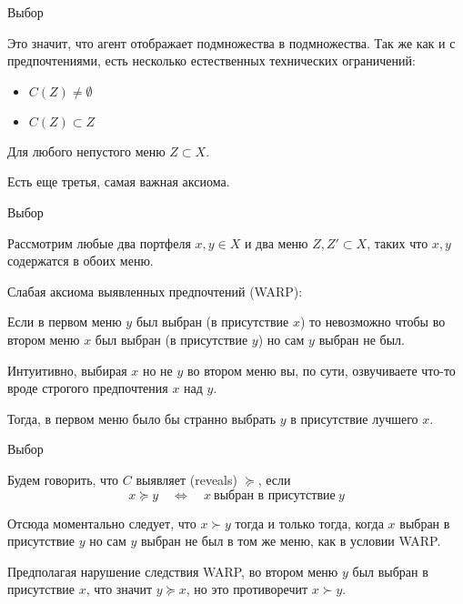 \documentclass{beamer}
\begin{document}
\begin{frame}{Выбор}

Это значит, что агент отображает подмножества в подмножества. Так же как и с предпочтениями, есть несколько естественных технических ограничений:

\begin{itemize}
  \item $C(Z) \neq \emptyset$
  \item $C(Z) \subset Z$
\end{itemize}

Для любого непустого меню $Z \subset X$. 

Есть еще третья, самая важная аксиома.

\end{frame}

\begin{frame}{Выбор}

Рассмотрим любые два портфеля $x, y \in X$ и два меню $Z,Z' \subset X$, таких что $x,y$ содержатся в обоих меню.

\begin{definition} 
\alert{Слабая аксиома выявленных предпочтений} (WARP): 

Если в первом меню $y$ был выбран (в присутствие $x$) то невозможно чтобы во втором меню $x$ был выбран (в присутствие $y$) но сам $y$ выбран не был.
\end{definition}

Интуитивно, выбирая $x$ но не $y$ во втором меню вы, по сути, озвучиваете что-то вроде строгого предпочтения $x$ над $y$. 

Тогда, в первом меню было бы странно выбрать $y$ в присутствие лучшего $x$.

\end{frame}

\begin{frame}{Выбор}

\begin{definition}
Будем говорить, что $C$ \alert{выявляет} (\alert{reveals}) $\succcurlyeq$, если
$$ x \succcurlyeq y \quad \Leftrightarrow \quad x \ \text{выбран в присутствие} \ y$$
\end{definition}
Отсюда моментально следует, что $x \succ y$ тогда и только тогда, когда $x$ выбран в присутствие $y$ но сам $y$ выбран не был в том же меню, как в условии WARP. 

Предполагая нарушение следствия WARP, во втором меню $y$ был выбран в присутствие $x$, что значит
$y \succcurlyeq x$, но это противоречит $x \succ y$.
\end{frame}
\end{document}

